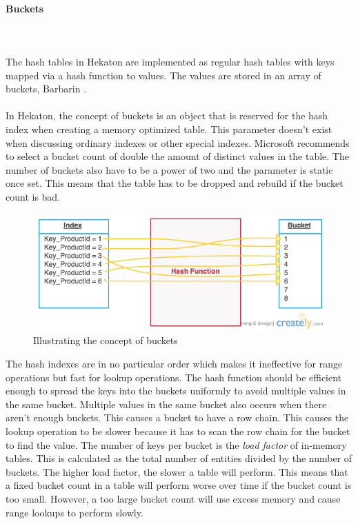 \documentclass{cslthse-msc}
\begin{document}
\paragraph*{Buckets}\mbox{}\\\\
The hash tables in Hekaton are implemented as regular hash tables with keys mapped via a hash function to values. The values are stored in an array of buckets, Barbarin \cite{Barbarin14}. \\\\
In Hekaton, the concept of buckets is an object that is reserved for the hash index when creating a memory optimized table. This parameter doesn't exist when discussing ordinary indexes or other special indexes. Microsoft recommends to select a bucket count of double the amount of distinct values in the table. The number of buckets also have to be a power of two and the parameter is static once set. This means that the table has to be dropped and rebuild if the bucket count is bad.

\begin{figure}[H]
\begin{center}
\includegraphics[scale=0.5]{Pictures/buckets.png}
\caption{Illustrating the concept of buckets}
\end{center}
\end{figure}

\noindent The hash indexes are in no particular order which makes it ineffective for range operations but fast for lookup operations. The hash function should be efficient enough to spread the keys into the buckets uniformly to avoid multiple values in the same bucket. Multiple values in the same bucket also occurs when there aren't enough buckets. This causes a bucket to have a row chain. This causes the lookup operation to be slower because it has to scan the row chain for the bucket to find the value. The number of keys per bucket is the \emph{load factor} of in-memory tables. This is calculated as the total number of entities divided by the number of buckets. The higher load factor, the slower a table will perform. This means that a fixed bucket count in a table will perform worse over time if the bucket count is too small. However, a too large bucket count will use excess memory and cause range lookups to perform slowly. 
\end{document}
